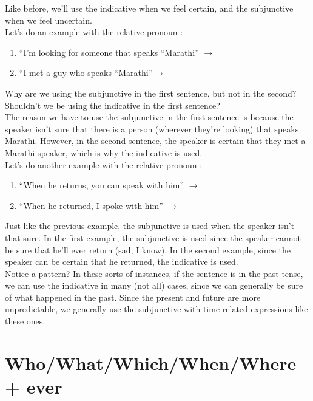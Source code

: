 Like before, we'll use the indicative when we feel certain, and the subjunctive when we feel uncertain. \\

Let's do an example with the relative pronoun :
\begin{enumerate}[noitemsep]
	\item ``I'm looking for someone that speaks ``Marathi'' $\rightarrow$ 
	\item ``I met a guy who speaks ``Marathi''$ \rightarrow$ 
\end{enumerate}

Why are we using the subjunctive in the first sentence, but not in the second? Shouldn't we be using the indicative in the first sentence? \\

The reason we have to use the subjunctive in the first sentence is because the speaker isn't sure that there is a person (wherever they're looking) that speaks Marathi. However, in the second sentence, the speaker is certain that they met a Marathi speaker, which is why the indicative is used. \\

Let's do another example with the relative pronoun :
\begin{enumerate}
	\item ``When he returns, you can speak with him'' $\rightarrow$ 
	\item ``When he returned, I spoke with him'' $\rightarrow$ 
\end{enumerate}

Just like the previous example, the subjunctive is used when the speaker isn't that sure. In the first example, the subjunctive is used since the speaker \underline{cannot} be sure that he'll ever return (sad, I know). In the second example, since the speaker can be certain that he returned, the indicative is used. \\

Notice a pattern? In these sorts of instances, if the sentence is in the past tense, we can use the indicative in many (not all) cases, since we can generally be sure of what happened in the past. Since the present and future are more unpredictable, we generally use the subjunctive with time-related expressions like these ones. 

\section{Who/What/Which/When/Where + ever}

